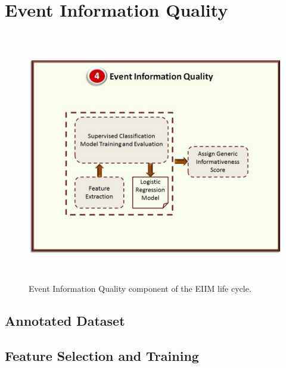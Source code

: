 \section{Event Information Quality\label{eventinfoquality}}

\begin{figure}[htbp]
  \caption{Event Information Quality component of the EIIM life cycle.}
  \centering
    \includegraphics[width=14cm,height=11cm]{Figures/EIIMComponents/EventInformationQuality.jpg}
\end{figure}


\subsection{Annotated Dataset}

\subsection{Feature Selection and Training}

